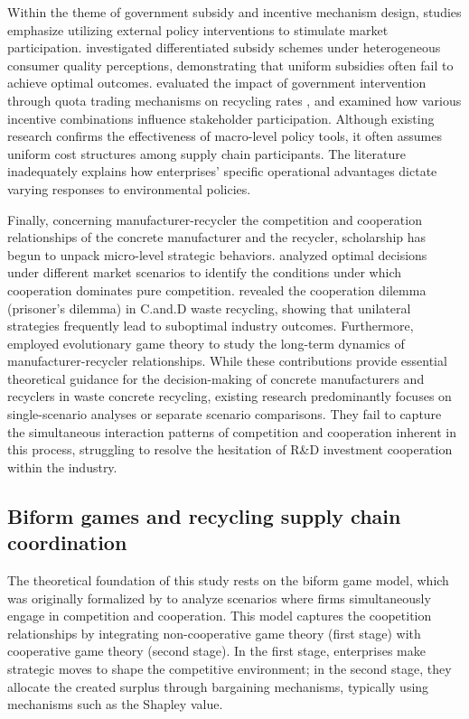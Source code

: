 \documentclass[authoryear,preprint,review,times,10pt]{elsarticle}
\begin{document}
Within the theme of government subsidy and incentive mechanism design, studies emphasize utilizing external policy interventions to stimulate market participation. \cite{yuan2023Differentiated} investigated differentiated subsidy schemes under heterogeneous consumer quality perceptions, demonstrating that uniform subsidies often fail to achieve optimal outcomes. \cite{su2024Stakeholder} evaluated the impact of government intervention through quota trading mechanisms on recycling rates , and \cite{zheng2024Optimal} examined how various incentive combinations influence stakeholder participation. 
Although existing research confirms the effectiveness of macro-level policy tools, it often assumes uniform cost structures among supply chain participants. The literature inadequately explains how enterprises' specific operational advantages dictate varying responses to environmental policies.

Finally, concerning manufacturer-recycler the competition and cooperation relationships of the concrete manufacturer and the recycler, scholarship has begun to unpack micro-level strategic behaviors. \cite{he2020Investigation} analyzed optimal decisions under different market scenarios to identify the conditions under which cooperation dominates pure competition. \cite{lin2025Cooperation} revealed the cooperation dilemma (prisoner's dilemma) in C.and.D waste recycling, showing that unilateral strategies frequently lead to suboptimal industry outcomes. Furthermore, \cite{li2025Mechanism} employed evolutionary game theory to study the long-term dynamics of manufacturer-recycler relationships. While these contributions provide essential theoretical guidance for the decision-making of concrete manufacturers and recyclers in waste concrete recycling, existing research predominantly focuses on single-scenario analyses or separate scenario comparisons. They fail to capture the simultaneous interaction patterns of competition and cooperation inherent in this process, struggling to resolve the hesitation of R\&D investment cooperation within the industry.

\subsection{Biform games and recycling supply chain coordination}
The theoretical foundation of this study rests on the biform game model, which was originally formalized by \cite{brandenburger2007Biform} to analyze scenarios where firms simultaneously engage in competition and cooperation. This model captures the coopetition relationships by integrating non-cooperative game theory (first stage) with cooperative game theory (second stage). In the first stage, enterprises make strategic moves to shape the competitive environment; in the second stage, they allocate the created surplus through bargaining mechanisms, typically using mechanisms such as the Shapley value.
\end{document}
